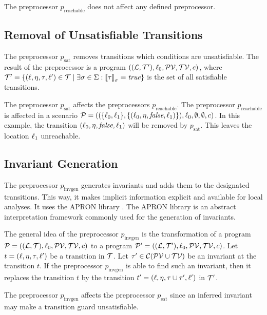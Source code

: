 The preprocessor $p_{\text{reachable}}$ does not affect any defined preprocessor.

\subsection{Removal of Unsatisfiable Transitions}

The preprocessor $p_{\text{sat}}$ removes transitions which conditions are unsatisfiable.
The result of the preprocessor is a program $((\mathcal{L}, \mathcal{T}'), \ell_0, \mathcal{PV}, \mathcal{TV}, c)$, where $\mathcal{T}' = \lbrace (\ell,\eta,\tau,\ell') \in \mathcal{T} \mid \exists \sigma \in \Sigma: \left\llbracket \tau \right\rrbracket_{\sigma} = \emph{true} \rbrace$ is the set of all satisfiable transitions.

The preprocessor $p_{\text{sat}}$ affects the preprocessors $p_{\text{reachable}}$.
The preprocessor $p_{\text{reachable}}$ is affected in a scenario $\mathcal{P} = ((\lbrace \ell_0, \ell_1 \rbrace, \lbrace (\ell_0,\eta,\emph{false},\ell_1) \rbrace), \ell_0, \emptyset, \emptyset, c)$.
In this example, the transition $(\ell_0,\eta,\emph{false},\ell_1)$ will be removed by $p_{\text{sat}}$.
This leaves the location $\ell_1$ unreachable.

\subsection{Invariant Generation}

The preprocessor $p_{\text{invgen}}$ generates invariants and adds them to the designated transitions.
This way, it makes implicit information explicit and available for local analyses.
It uses the APRON library \cite{apron}.
The APRON library is an abstract interpretation framework commonly used for the generation of invariants.

The general idea of the preprocessor $p_{\text{invgen}}$ is the transformation of a program $\mathcal{P} = ((\mathcal{L}, \mathcal{T}), \ell_0, \mathcal{PV}, \mathcal{TV}, c)$ to a program $\mathcal{P}' = ((\mathcal{L}, \mathcal{T}'), \ell_0, \mathcal{PV}, \mathcal{TV}, c)$.
Let $t = (\ell, \eta, \tau, \ell')$ be a transition in $\mathcal{T}$.
Let $\tau' \in \mathcal{C} (\mathcal{PV} \cup \mathcal{TV})$ be an invariant at the transition $t$.
If the preprocessor $p_{\text{invgen}}$ is able to find such an invariant, then it replaces the transition $t$ by the transition $t' = (\ell, \eta, \tau \cup \tau', \ell')$ in $\mathcal{T}'$.

The preprocessor $p_{\text{invgen}}$ affects the preprocessor $p_{\text{sat}}$ since an inferred invariant may make a transition guard unsatisfiable.

